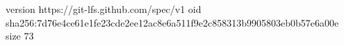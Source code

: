 version https://git-lfs.github.com/spec/v1
oid sha256:7d76e4ce61e1fe23cde2ee12ac8e6a511f9e2c858313b9905803eb0b57e6a00e
size 73
